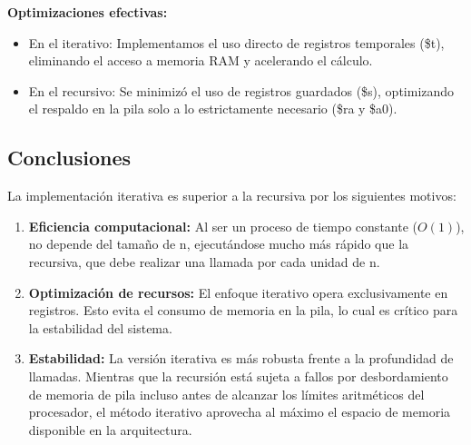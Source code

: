 \documentclass[12pt]{article}
\begin{document}
\textbf{Optimizaciones efectivas:}

\begin{itemize}
    \item En el iterativo: Implementamos el uso directo de registros temporales (\$t), eliminando el acceso a memoria RAM y acelerando el cálculo.
    \item En el recursivo: Se minimizó el uso de registros guardados (\$s), optimizando el respaldo en la pila solo a lo estrictamente necesario (\$ra y \$a0).
\end{itemize}

\subsection*{Conclusiones}

La implementación iterativa es superior a la recursiva por los siguientes motivos:

\begin{enumerate}
    \item \textbf{Eficiencia computacional:} Al ser un proceso de tiempo constante ($O(1)$), no depende del tamaño de n, ejecutándose mucho más rápido que la recursiva, que debe realizar una llamada por cada unidad de n.
    \item \textbf{Optimización de recursos:} El enfoque iterativo opera exclusivamente en registros. Esto evita el consumo de memoria en la pila, lo cual es crítico para la estabilidad del sistema.
    \item \textbf{Estabilidad:} La versión iterativa es más robusta frente a la profundidad de llamadas. Mientras que la recursión está sujeta a fallos por desbordamiento de memoria de pila incluso antes de alcanzar los límites aritméticos del procesador, el método iterativo aprovecha al máximo el espacio de memoria disponible en la arquitectura.
\end{enumerate}
\end{document}
